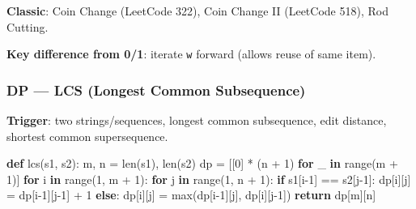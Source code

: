 \documentclass[11pt]{article}
\newenvironment{Shaded}{\begin{snugshade}}{\end{snugshade}}
\newcommand{\BuiltInTok}[1]{\textcolor[rgb]{0.50,0.55,0.55}{#1}}
\newcommand{\ControlFlowTok}[1]{\textcolor[rgb]{0.99,0.74,0.29}{\textbf{#1}}}
\newcommand{\DecValTok}[1]{\textcolor[rgb]{0.96,0.45,0.00}{#1}}
\newcommand{\KeywordTok}[1]{\textcolor[rgb]{0.81,0.81,0.76}{\textbf{#1}}}
\newcommand{\NormalTok}[1]{\textcolor[rgb]{0.81,0.81,0.76}{#1}}
\newcommand{\OperatorTok}[1]{\textcolor[rgb]{0.81,0.81,0.76}{#1}}
\begin{document}
\textbf{Classic}: Coin Change (LeetCode 322), Coin Change II (LeetCode 518), Rod Cutting.

\textbf{Key difference from 0/1}: iterate \texttt{w} forward (allows reuse of same item).

\subsubsection{DP --- LCS (Longest Common Subsequence)}\label{dp--lcs-longest-common-subsequence}

\textbf{Trigger}: two strings/sequences, longest common subsequence, edit distance, shortest common supersequence.


\begin{Shaded}
\begin{Highlighting}[]
\KeywordTok{def}\NormalTok{ lcs(s1, s2):}
\NormalTok{    m, n }\OperatorTok{=} \BuiltInTok{len}\NormalTok{(s1), }\BuiltInTok{len}\NormalTok{(s2)}
\NormalTok{    dp }\OperatorTok{=}\NormalTok{ [[}\DecValTok{0}\NormalTok{] }\OperatorTok{*}\NormalTok{ (n }\OperatorTok{+} \DecValTok{1}\NormalTok{) }\ControlFlowTok{for}\NormalTok{ \_ }\KeywordTok{in} \BuiltInTok{range}\NormalTok{(m }\OperatorTok{+} \DecValTok{1}\NormalTok{)]}
    \ControlFlowTok{for}\NormalTok{ i }\KeywordTok{in} \BuiltInTok{range}\NormalTok{(}\DecValTok{1}\NormalTok{, m }\OperatorTok{+} \DecValTok{1}\NormalTok{):}
        \ControlFlowTok{for}\NormalTok{ j }\KeywordTok{in} \BuiltInTok{range}\NormalTok{(}\DecValTok{1}\NormalTok{, n }\OperatorTok{+} \DecValTok{1}\NormalTok{):}
            \ControlFlowTok{if}\NormalTok{ s1[i}\OperatorTok{{-}}\DecValTok{1}\NormalTok{] }\OperatorTok{==}\NormalTok{ s2[j}\OperatorTok{{-}}\DecValTok{1}\NormalTok{]:}
\NormalTok{                dp[i][j] }\OperatorTok{=}\NormalTok{ dp[i}\OperatorTok{{-}}\DecValTok{1}\NormalTok{][j}\OperatorTok{{-}}\DecValTok{1}\NormalTok{] }\OperatorTok{+} \DecValTok{1}
            \ControlFlowTok{else}\NormalTok{:}
\NormalTok{                dp[i][j] }\OperatorTok{=} \BuiltInTok{max}\NormalTok{(dp[i}\OperatorTok{{-}}\DecValTok{1}\NormalTok{][j], dp[i][j}\OperatorTok{{-}}\DecValTok{1}\NormalTok{])}
    \ControlFlowTok{return}\NormalTok{ dp[m][n]}


\end{Highlighting}
\end{Shaded}
\end{document}
